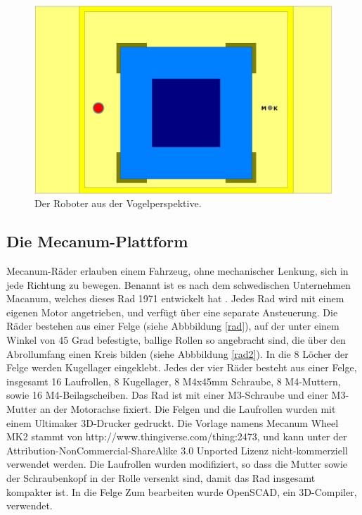 \documentclass[a4paper,bibtotoc,oneside]{scrbook}
\begin{document}
\begin{figure}[htbp]
\centering
\includegraphics[width=125mm]{img/oben2.png}
\caption{Der Roboter aus der Vogelperspektive.}\label{oben}
\end{figure}
  

\subsection{Die Mecanum-Plattform}\thispagestyle{empty}
Mecanum-Räder erlauben einem Fahrzeug, ohne mechanischer Lenkung, sich in jede Richtung zu bewegen. Benannt ist es nach dem schwedischen Unternehmen Macanum, welches dieses Rad 1971 entwickelt hat \cite{mecanum}. 
Jedes Rad wird mit einem eigenen Motor angetrieben, und verfügt über eine separate Ansteuerung. Die Räder bestehen aus einer Felge (siehe Abbbildung \ref{rad}), auf der unter einem Winkel von 45 Grad befestigte, ballige Rollen so angebracht sind, die über den Abrollumfang einen Kreis bilden (siehe Abbbildung \ref{rad2}). In die 8 Löcher der Felge werden Kugellager eingeklebt. Jedes der vier Räder besteht aus einer Felge, insgesamt 16 Laufrollen, 8 Kugellager, 8 M4x45mm Schraube, 8 M4-Muttern, sowie 16 M4-Beilagscheiben. 
Das Rad ist mit einer M3-Schraube und einer M3-Mutter an der Motorachse fixiert.
Die Felgen und die Laufrollen wurden mit einem Ultimaker 3D-Drucker gedruckt. 
Die Vorlage namens Mecanum Wheel MK2 stammt von http://www.thingiverse.com/thing:2473, und kann unter der Attribution-NonCommercial-ShareAlike 3.0 Unported Lizenz nicht-kommerziell verwendet werden.
Die Laufrollen wurden modifiziert, so dass die Mutter sowie der Schraubenkopf in der Rolle versenkt sind, damit das Rad insgesamt kompakter ist. In die Felge  Zum bearbeiten wurde OpenSCAD, ein 3D-Compiler, verwendet. 
\end{document}
